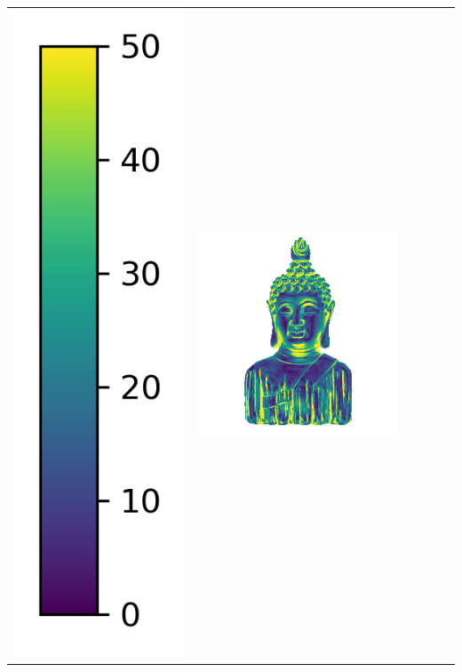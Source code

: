 \begin{tabularx}{\linewidth}{@{}Y@{}Y@{}Y@{}Y@{}Y@{}Y@{}}
\includegraphics[width=0.2\linewidth]{semisynthetic/colorbar_error_vertical.png} &
\includegraphics[width=\linewidth]{semisynthetic/20160617_16_ours_err.png} &

\end{tabularx}
